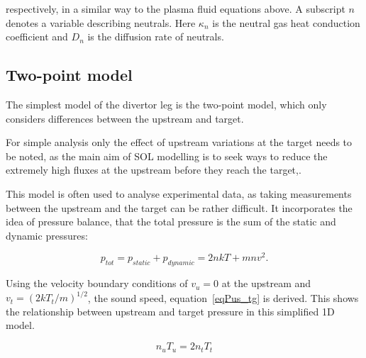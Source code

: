 \documentclass[12pt]{article}  %
\begin{document}
respectively, in a similar way to the plasma fluid equations above. A subscript $n$ denotes a variable describing neutrals. Here $\kappa_n$ is the neutral gas heat conduction coefficient and $D_n$ is the diffusion rate of neutrals.


\subsection{Two-point model}\label{ssec2PT}
The simplest model of the divertor leg is the two-point model, which only considers differences between the upstream and target. 

For simple analysis only the effect of upstream variations at the target needs to be noted, as the main aim of SOL modelling is to seek ways to reduce the extremely high fluxes at the upstream before they reach the target,. 

This model is often used to analyse experimental data, as taking measurements between the upstream and the target can be rather difficult. It incorporates the idea of pressure balance, that the total pressure is the sum of the static and dynamic pressures:

  \begin{equation}\label{eqPbal}
  p_{tot} = p_{static} + p_{dynamic} = 2nkT + mnv^2.
  \end{equation}

Using the velocity boundary conditions of $ v_u=0 $ at the upstream and $ v_t=(2kT_t/m)^{1/2} $, the sound speed, equation~\ref{eqPus_tg} is derived. This shows the relationship between upstream and target pressure in this simplified 1D model.

  \begin{equation}\label{eqPus_tg}
  n_uT_u = 2n_tT_t
  \end{equation}
\end{document}
